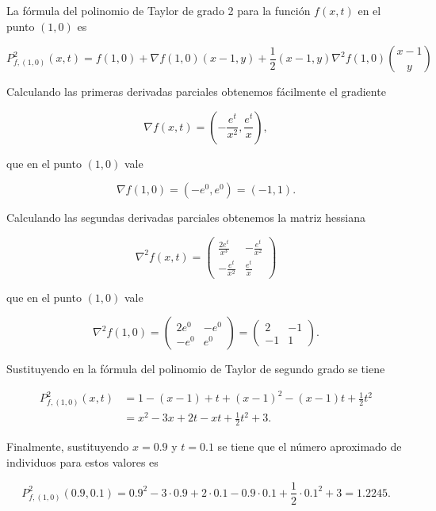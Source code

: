 \documentclass[
  a4paper,
]{scrreport}
\theoremstyle{definition}
\theoremstyle{remark}
\begin{document}
\begin{tcolorbox}[enhanced jigsaw, coltitle=black, toptitle=1mm, colframe=quarto-callout-tip-color-frame, colbacktitle=quarto-callout-tip-color!10!white, breakable, opacityback=0, bottomtitle=1mm, opacitybacktitle=0.6, title=\textcolor{quarto-callout-tip-color}{\faLightbulb}\hspace{0.5em}{Solución}, arc=.35mm, leftrule=.75mm, toprule=.15mm, titlerule=0mm, bottomrule=.15mm, left=2mm, rightrule=.15mm, colback=white]

La fórmula del polinomio de Taylor de grado 2 para la función \(f(x,t)\)
en el punto \((1,0)\) es

\[
P^2_{f,(1,0)}(x,t) = f(1,0) + \nabla f(1,0)(x-1, y) + \frac{1}{2} (x-1, y)\nabla^2 f(1,0)\binom{x-1}{y}
\]

Calculando las primeras derivadas parciales obtenemos fácilmente el
gradiente

\[
\nabla f(x,t) = \left(-\frac{e^t}{x^2}, \frac{e^t}{x}\right),
\]

que en el punto \((1,0)\) vale

\[
\nabla f(1,0) = (-e^0, e^0) = (-1, 1).
\]

Calculando las segundas derivadas parciales obtenemos la matriz hessiana

\[
\nabla^2 f(x,t)
= \begin{pmatrix}
\frac{2e^t}{x^3} & -\frac{e^t}{x^2} \\
-\frac{e^t}{x^2} & \frac{e^t}{x}
\end{pmatrix}
\]

que en el punto \((1,0)\) vale

\[
\nabla^2 f(1,0) 
= \begin{pmatrix}
2e^0 & -e^0 \\
-e^0 & e^0
\end{pmatrix} 
= \begin{pmatrix}
2 & -1 \\
-1 & 1
\end{pmatrix}.
\]

Sustituyendo en la fórmula del polinomio de Taylor de segundo grado se
tiene

\begin{align*}
P^2_{f,(1,0)}(x,t) 
&= 1 - (x-1) + t + (x-1)^2 - (x-1)t + \frac{1}{2}t^2 \\
&= x^2 -3x + 2t -xt + \frac{1}{2}t^2 + 3.
\end{align*}

Finalmente, sustituyendo \(x=0.9\) y \(t=0.1\) se tiene que el número
aproximado de individuos para estos valores es

\[
P^2_{f,(1,0)}(0.9,0.1) = 0.9^2 -3\cdot 0.9 + 2\cdot 0.1 -0.9\cdot 0.1 + \frac{1}{2}\cdot 0.1^2 + 3 = 1.2245.
\]

\end{tcolorbox}
\end{document}
